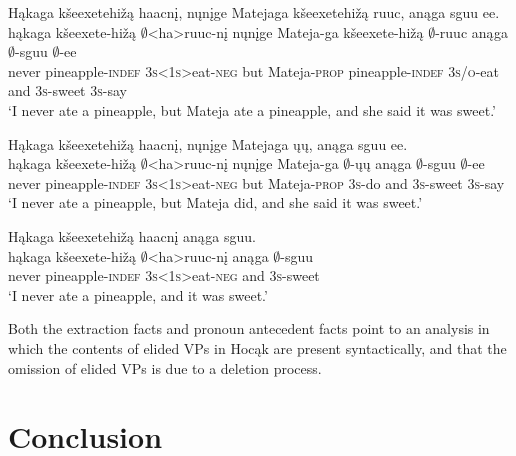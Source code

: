 \documentclass[output=paper]{LSP/langsci}
\begin{document}
 
\ea
\ea\label{ex:johnson:51a} 
\glll Hąkaga kšeexetehižą haacnį, nųnįge Matejaga kšeexetehižą ruuc, anąga sguu ee.\\
hąkaga kšeexete-hižą $\emptyset$<ha>ruuc-nį nųnįge Mateja-ga kšeexete-hižą $\emptyset$-ruuc anąga $\emptyset$-sguu $\emptyset$-ee\\
never pineapple-\textsc{indef} \textsc{3s<1s>}eat-\textsc{neg} but Mateja-\textsc{prop} pineapple-\textsc{indef} \textsc{3s/o}-eat and \textsc{3s}-sweet \textsc{3s}-say\\
\trans `I never ate a pineapple, but Mateja ate a pineapple, and she said it was sweet.'
 
\ex\label{ex:johnson:51b} 
\glll Hąkaga kšeexetehižą haacnį, nųnįge Matejaga ųų, anąga sguu ee.\\
hąkaga kšeexete-hižą $\emptyset$<ha>ruuc-nį nųnįge Mateja-ga {\db}$\emptyset$-ųų anąga $\emptyset$-sguu $\emptyset$-ee\\
never pineapple-\textsc{indef} \textsc{3s<1s>}eat-\textsc{neg} but Mateja-\textsc{prop} \textsc{3s}-do and \textsc{3s}-sweet \textsc{3s}-say\\
\trans `I never ate a pineapple, but Mateja did, and she said it was sweet.'
\z
\z
 
\ea\label{ex:johnson:52} 
\glll Hąkaga kšeexetehižą haacnį anąga sguu.\\
hąkaga kšeexete-hižą $\emptyset$<ha>ruuc-nį anąga $\emptyset$-sguu\\
never pineapple-\textsc{indef} \textsc{3s<1s>}eat-\textsc{neg} and \textsc{3s}-sweet\\
\trans `I never ate a pineapple, and it was sweet.'
\z


Both the extraction facts and pronoun antecedent facts point to an analysis in which the contents of elided VPs in Hocąk are present syntactically, and that the omission of elided VPs is due to a deletion process.

\section{Conclusion}\label{sec:johnson:5}
\end{document}
